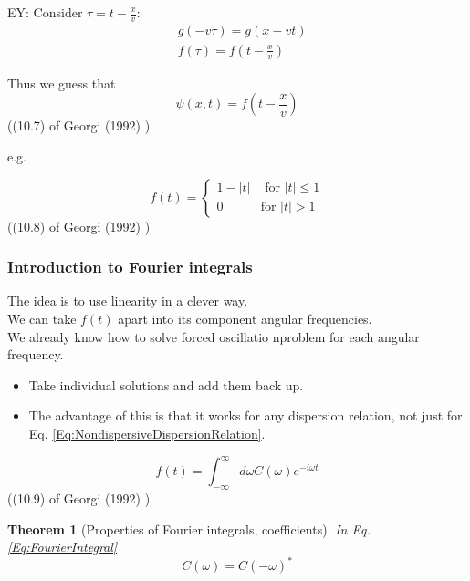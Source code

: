 \documentclass[10pt]{amsart}
\newtheorem{theorem}{Theorem}
\begin{document}
\begin{multicols*}{2}
EY: Consider $\tau = t- \frac{x}{v}$:
\[
\begin{aligned}
	& g(-v\tau) = g(x-vt) \\
	& f(\tau) = f(t-\frac{x}{v})
\end{aligned}
\]

Thus we guess that 
\begin{equation}
	\psi(x,t) = f(t- \frac{x}{v})
\end{equation}
((10.7) of Georgi (1992) \cite{Geor1992})

e.g. 

\begin{equation}
	f(t) = \begin{cases} 1 - |t| & \text{ for } |t| \leq 1 \\
		0 & \text{for } |t| >1 \end{cases}
\end{equation}
((10.8) of Georgi (1992) \cite{Geor1992})

\subsubsection{Introduction to Fourier integrals}

The idea is to use linearity in a clever way. \\
We can take $f(t)$ apart into its component angular frequencies. \\
We already know how to solve forced oscillatio nproblem for each angular frequency. \\
\begin{itemize}
	\item Take individual solutions and add them back up. 
	\item The advantage of this is that it works for any dispersion relation, not just for Eq. \ref{Eq:NondispersiveDispersionRelation}.
\end{itemize}

\begin{equation}\label{Eq:FourierIntegral}
	f(t) = \int_{-\infty}^{\infty} d\omega C(\omega) e^{-i\omega t}
\end{equation}
((10.9) of Georgi (1992) \cite{Geor1992})

\begin{theorem}[Properties of Fourier integrals, coefficients]
In Eq. \ref{Eq:FourierIntegral}
\begin{equation}
	C(\omega) = C(-\omega)^*
\end{equation}
\end{theorem}


\end{multicols*}
\end{document}
